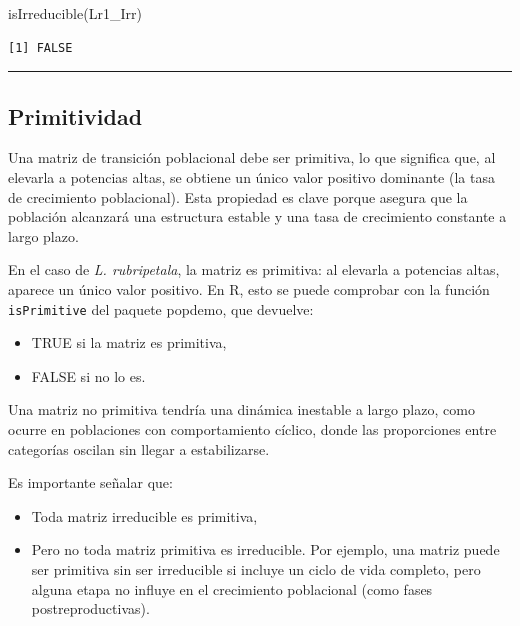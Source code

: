 \documentclass[
  12pt,
  letterpaper,
]{book}
\newenvironment{Shaded}{\begin{snugshade}}{\end{snugshade}}
\newcommand{\FunctionTok}[1]{\textcolor[rgb]{0.28,0.35,0.67}{#1}}
\newcommand{\NormalTok}[1]{\textcolor[rgb]{0.00,0.23,0.31}{#1}}
\providecommand{\tightlist}{%
  \setlength{\itemsep}{0pt}\setlength{\parskip}{0pt}}\usepackage{longtable,booktabs,array}
\begin{document}
\begin{Shaded}
\begin{Highlighting}[]
\FunctionTok{isIrreducible}\NormalTok{(Lr1\_Irr)}
\end{Highlighting}
\end{Shaded}

\begin{verbatim}
[1] FALSE
\end{verbatim}

\begin{center}\rule{0.5\linewidth}{0.5pt}\end{center}

\subsection{Primitividad}\label{primitividad}

Una matriz de transición poblacional debe ser primitiva, lo que
significa que, al elevarla a potencias altas, se obtiene un único valor
positivo dominante (la tasa de crecimiento poblacional). Esta propiedad
es clave porque asegura que la población alcanzará una estructura
estable y una tasa de crecimiento constante a largo plazo.

En el caso de \emph{L. rubripetala}, la matriz es primitiva: al elevarla
a potencias altas, aparece un único valor positivo. En R, esto se puede
comprobar con la función \texttt{isPrimitive} del paquete popdemo, que
devuelve:

\begin{itemize}
\tightlist
\item
  TRUE si la matriz es primitiva,
\item
  FALSE si no lo es.
\end{itemize}

Una matriz no primitiva tendría una dinámica inestable a largo plazo,
como ocurre en poblaciones con comportamiento cíclico, donde las
proporciones entre categorías oscilan sin llegar a estabilizarse.

Es importante señalar que:

\begin{itemize}
\tightlist
\item
  Toda matriz irreducible es primitiva,
\item
  Pero no toda matriz primitiva es irreducible. Por ejemplo, una matriz
  puede ser primitiva sin ser irreducible si incluye un ciclo de vida
  completo, pero alguna etapa no influye en el crecimiento poblacional
  (como fases postreproductivas).
\end{itemize}
\end{document}
